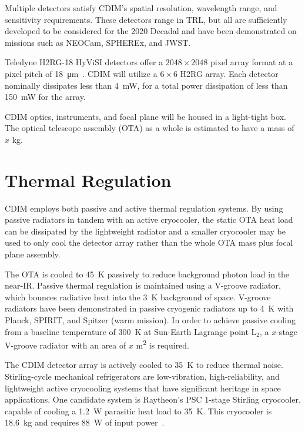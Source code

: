 \documentclass{ws-jai}
\begin{document}
Multiple detectors satisfy CDIM's spatial resolution, wavelength range, and sensitivity requirements.
These detectors range in TRL, but all are sufficiently developed to be considered for the 2020 Decadal and have been demonstrated on missions such as NEOCam, SPHEREx, and JWST\@.

Teledyne H2RG-18 HyViSI detectors offer a $2048\times2048$ pixel array format at a pixel pitch of \SI{18}{\micro\meter}~\cite{teledyneH2RG}.
CDIM will utilize a $6\times6$ H2RG array.
Each detector nominally dissipates less than \SI{4}{\milli\watt}, for a total power dissipation of less than \SI{150}{\milli\watt} for the array.

CDIM optics, instruments, and focal plane will be housed in a light-tight box.
The optical telescope assembly (OTA) as a whole is estimated to have a mass of $x$ \si{\kilo\gram}.

\section{Thermal Regulation}
\label{sec:thermal}
CDIM employs both passive and active thermal regulation systems.
By using passive radiators in tandem with an active cryocooler, the static OTA heat load can be dissipated by the lightweight radiator and a smaller cryocooler may be used to only cool the detector array rather than the whole OTA mass plus focal plane assembly.

The OTA is cooled to \SI{45}{\kelvin} passively to reduce background photon load in the near-IR.\@
Passive thermal regulation is maintained using a V-groove radiator, which bounces radiative heat into the \SI{3}{\kelvin} background of space.
V-groove radiators have been demonstrated in passive cryogenic radiators up to \SI{4}{\kelvin} with Planck, SPIRIT, and Spitzer (warm mission).\@
In order to achieve passive cooling from a baseline temperature of \SI{300}{\kelvin} at Sun-Earth Lagrange point L$_2$, a $x$-stage V-groove radiator with an area of $x$ \si{\meter\squared} is required.

The CDIM detector array is actively cooled to \SI{35}{\kelvin} to reduce thermal noise.
Stirling-cycle mechanical refrigerators are low-vibration, high-reliability, and lightweight active cryocooling systems that have significant heritage in space applications.
One candidate system is Raytheon's PSC 1-stage Stirling cryocooler, capable of cooling a \SI{1.2}{\watt} parasitic heat load to \SI{35}{\kelvin}.
This cryocooler is \SI{18.6}{\kilo\gram} and requires \SI{88}{\watt} of input power~\cite{tchandbook2003}.
\end{document}
